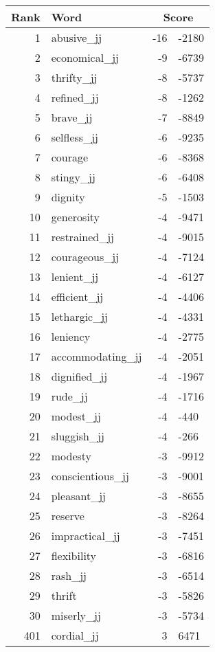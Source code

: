 \begin{longtable}[!htbp]{| rlr@{.}l |}
    \hline
    \textbf{Rank} & \textbf{Word} & \multicolumn{2}{c|}{\textbf{Score}} \\
    \hline
    \endhead
    1 & abusive\_jj & -16 & -2180 \\
    2 & economical\_jj & -9 & -6739 \\
    3 & thrifty\_jj & -8 & -5737 \\
    4 & refined\_jj & -8 & -1262 \\
    5 & brave\_jj & -7 & -8849 \\
    6 & selfless\_jj & -6 & -9235 \\
    7 & courage & -6 & -8368 \\
    8 & stingy\_jj & -6 & -6408 \\
    9 & dignity & -5 & -1503 \\
    10 & generosity & -4 & -9471 \\
    11 & restrained\_jj & -4 & -9015 \\
    12 & courageous\_jj & -4 & -7124 \\
    13 & lenient\_jj & -4 & -6127 \\
    14 & efficient\_jj & -4 & -4406 \\
    15 & lethargic\_jj & -4 & -4331 \\
    16 & leniency & -4 & -2775 \\
    17 & accommodating\_jj & -4 & -2051 \\
    18 & dignified\_jj & -4 & -1967 \\
    19 & rude\_jj & -4 & -1716 \\
    20 & modest\_jj & -4 & -440 \\
    21 & sluggish\_jj & -4 & -266 \\
    22 & modesty & -3 & -9912 \\
    23 & conscientious\_jj & -3 & -9001 \\
    24 & pleasant\_jj & -3 & -8655 \\
    25 & reserve & -3 & -8264 \\
    26 & impractical\_jj & -3 & -7451 \\
    27 & flexibility & -3 & -6816 \\
    28 & rash\_jj & -3 & -6514 \\
    29 & thrift & -3 & -5826 \\
    30 & miserly\_jj & -3 & -5734 \\
    401 & cordial\_jj & 3 & 6471 \\

\end{longtable}
